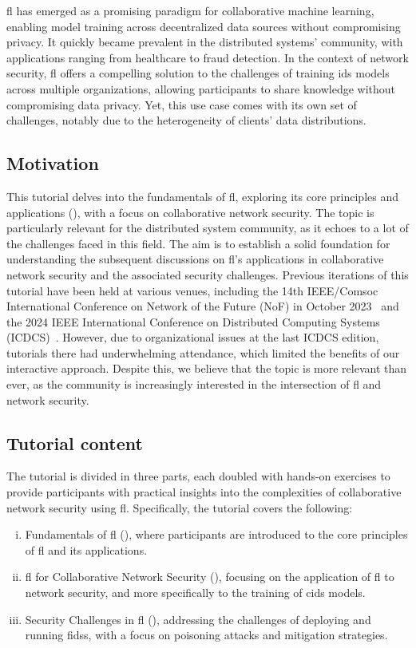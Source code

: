 \documentclass[conference]{IEEEtran}
\begin{document}
\gls{fl} has emerged as a promising paradigm for collaborative machine learning, enabling model training across decentralized data sources without compromising privacy.
It quickly became prevalent in the distributed systems' community, with applications ranging from healthcare to fraud detection.
In the context of network security, \gls{fl} offers a compelling solution to the challenges of training \gls{ids} models across multiple organizations, allowing participants to share knowledge without compromising data privacy.
Yet, this use case comes with its own set of challenges, notably due to the heterogeneity of clients' data distributions.

\subsection{Motivation}

This tutorial delves into the fundamentals of \gls{fl}, exploring its core principles and applications (), with a focus on collaborative network security.
The topic is particularly relevant for the distributed system community, as it echoes to a lot of the challenges faced in this field.
The aim is to establish a solid foundation for understanding the subsequent discussions on \gls{fl}'s applications in collaborative network security and the associated security challenges.
Previous iterations of this tutorial have been held at various venues, including the 14th IEEE/Comsoc International Conference on Network of the Future (NoF) in October 2023~\cite{lavaur_nof_tuto_2023} and the 2024 IEEE International Conference on Distributed Computing Systems (ICDCS)~\cite{lavaur_icdcs_tuto_2024}.
However, due to organizational issues at the last ICDCS edition, tutorials there had underwhelming attendance, which limited the benefits of our interactive approach.
Despite this, we believe that the topic is more relevant than ever, as the community is increasingly interested in the intersection of \gls{fl} and network security.


\subsection{Tutorial content}

The tutorial is divided in three parts, each doubled with hands-on exercises to provide participants with practical insights into the complexities of collaborative network security using \gls{fl}.
Specifically, the tutorial covers the following:
\begin{enumerate}[(i)]
    \item Fundamentals of \acrfull{fl} (), where participants are introduced to the core principles of \gls{fl} and its applications.
    \item \gls{fl} for Collaborative Network Security (), focusing on the application of \gls{fl} to network security, and more specifically to the training of \gls{cids} models.
    \item Security Challenges in \gls{fl} (), addressing the challenges of deploying and running \glspl{fids}, with a focus on poisoning attacks and mitigation strategies.
\end{enumerate}
\end{document}
